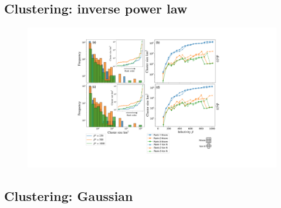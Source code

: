 \subsection{Clustering: inverse power law}

\begin{figure}
    \centering
    \includegraphics[scale=0.45]{chapter6/figures/fig6-pl-cluster-distribution.pdf}
    \caption{\blindtext}
    \label{fig:my_label}
\end{figure}

\blindtext

\blindtext

\blindtext

\subsection{Clustering: Gaussian}









